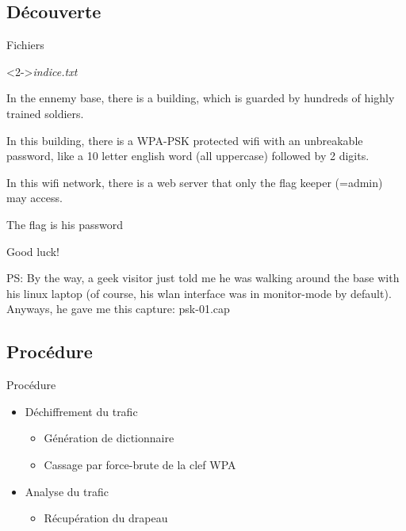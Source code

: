 \documentclass[10pt,sans,usenames,dvipsnames,french,compress]{beamer}
\begin{document}
\subsection{Découverte}
\begin{frame}
	\begin{block}{Fichiers}
		\begin{small}
		\end{small}
	\end{block}

	\begin{block}<2->{\textit{indice.txt}}
		\begin{itshape}	
			\begin{small}
				In the ennemy base, there is a building, which is guarded by hundreds of 
				highly trained soldiers.

				In this building, there is a WPA-PSK protected wifi with an unbreakable
				password, like {a 10 letter english word (all uppercase) followed by 2
				digits}.

				In this wifi network, there is a web server that only the flag keeper
				(=admin) may access.

				{The flag is his password}

				Good luck!

				PS: By the way, a geek visitor just told me he was walking around 
				the base with his linux laptop (of course, his wlan interface was 
				in  monitor-mode by default). Anyways, he gave me this capture:
				{psk-01.cap}
			\end{small}
		\end{itshape}
	\end{block}
\end{frame}

\subsection{Procédure}
\begin{frame}{Procédure}
	\begin{itemize}
		\item Déchiffrement du trafic
		\begin{itemize}
			\item Génération de dictionnaire
			\item Cassage par force-brute de la clef WPA
		\end{itemize}
		\item Analyse du trafic
		\begin{itemize}
			\item Récupération du drapeau
		\end{itemize}
	\end{itemize}
\end{frame}
\end{document}
